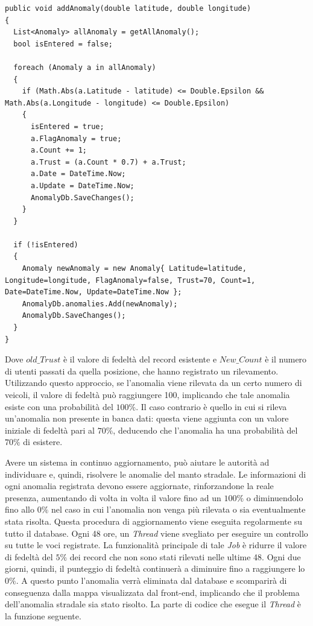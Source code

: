 \documentclass[a4paper, 11pt]{article} %
\begin{document}
\begin{lstlisting}
public void addAnomaly(double latitude, double longitude)
{
  List<Anomaly> allAnomaly = getAllAnomaly();
  bool isEntered = false;

  foreach (Anomaly a in allAnomaly)
  {
    if (Math.Abs(a.Latitude - latitude) <= Double.Epsilon && Math.Abs(a.Longitude - longitude) <= Double.Epsilon)
    {
      isEntered = true;
      a.FlagAnomaly = true;
      a.Count += 1;
      a.Trust = (a.Count * 0.7) + a.Trust;
      a.Date = DateTime.Now;
      a.Update = DateTime.Now;
      AnomalyDb.SaveChanges();
    }
  }

  if (!isEntered)
  {
    Anomaly newAnomaly = new Anomaly{ Latitude=latitude, Longitude=longitude, FlagAnomaly=false, Trust=70, Count=1,  Date=DateTime.Now, Update=DateTime.Now };
    AnomalyDb.anomalies.Add(newAnomaly);
    AnomalyDb.SaveChanges();
  }
}
\end{lstlisting}
Dove $old\_Trust$ è il valore di fedeltà del record esistente e $New\_Count$ è il numero di utenti passati da quella posizione, che hanno registrato un rilevamento. Utilizzando questo approccio, se l'anomalia viene rilevata da un certo numero di veicoli, il valore di fedeltà può raggiungere 100, implicando che tale anomalia esiste con una probabilità del $100\%$.
Il caso contrario è quello in cui si rileva un’anomalia non presente in banca dati: questa viene aggiunta con un valore iniziale di fedeltà pari al $70\%$, deducendo che l'anomalia ha una probabilità del $70\%$ di esistere.

Avere un sistema in continuo aggiornamento, può aiutare le autorità ad individuare e, quindi, risolvere le anomalie del manto stradale. Le informazioni di ogni anomalia registrata devono essere aggiornate, rinforzandone la reale presenza, aumentando di volta in volta il valore fino ad un $100\%$ o diminuendolo fino allo $0\%$ nel caso in cui l'anomalia non venga più rilevata o sia eventualmente stata risolta. Questa procedura di aggiornamento viene eseguita regolarmente su tutto il database. Ogni 48 ore, un \textit{Thread} viene svegliato per eseguire un controllo su tutte le voci registrate. La funzionalità principale di tale \textit{Job} è ridurre il valore di fedeltà del $5\%$ dei record che non sono stati rilevati nelle ultime 48. Ogni due giorni, quindi, il punteggio di fedeltà continuerà a diminuire fino a raggiungere lo $0\%$. A questo punto l'anomalia verrà eliminata dal database e scomparirà di conseguenza dalla mappa visualizzata dal front-end, implicando che il problema dell'anomalia stradale sia stato risolto. La parte di codice che esegue il \textit{Thread} è la funzione seguente.
\end{document}
